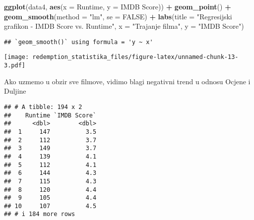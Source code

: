 \documentclass[
]{article}
\newenvironment{Shaded}{\begin{snugshade}}{\end{snugshade}}
\newcommand{\AttributeTok}[1]{\textcolor[rgb]{0.13,0.29,0.53}{#1}}
\newcommand{\CommentTok}[1]{\textcolor[rgb]{0.56,0.35,0.01}{\textit{#1}}}
\newcommand{\ConstantTok}[1]{\textcolor[rgb]{0.56,0.35,0.01}{#1}}
\newcommand{\FloatTok}[1]{\textcolor[rgb]{0.00,0.00,0.81}{#1}}
\newcommand{\FunctionTok}[1]{\textcolor[rgb]{0.13,0.29,0.53}{\textbf{#1}}}
\newcommand{\NormalTok}[1]{#1}
\newcommand{\OtherTok}[1]{\textcolor[rgb]{0.56,0.35,0.01}{#1}}
\newcommand{\SpecialCharTok}[1]{\textcolor[rgb]{0.81,0.36,0.00}{\textbf{#1}}}
\newcommand{\StringTok}[1]{\textcolor[rgb]{0.31,0.60,0.02}{#1}}
\begin{document}
\begin{Shaded}
\begin{Highlighting}[]
\FunctionTok{ggplot}\NormalTok{(data4, }\FunctionTok{aes}\NormalTok{(}\AttributeTok{x =}\NormalTok{ Runtime, }\AttributeTok{y =} \StringTok{\textasciigrave{}}\AttributeTok{IMDB Score}\StringTok{\textasciigrave{}}\NormalTok{)) }\SpecialCharTok{+}
  \FunctionTok{geom\_point}\NormalTok{() }\SpecialCharTok{+}
  \FunctionTok{geom\_smooth}\NormalTok{(}\AttributeTok{method =} \StringTok{"lm"}\NormalTok{, }\AttributeTok{se =} \ConstantTok{FALSE}\NormalTok{) }\SpecialCharTok{+}
  \FunctionTok{labs}\NormalTok{(}\AttributeTok{title =} \StringTok{"Regresijski grafikon {-} IMDB Score vs. Runtime"}\NormalTok{, }
       \AttributeTok{x =} \StringTok{"Trajanje filma"}\NormalTok{, }\AttributeTok{y =} \StringTok{"IMDB Score"}\NormalTok{)}
\end{Highlighting}
\end{Shaded}

\begin{verbatim}
## `geom_smooth()` using formula = 'y ~ x'
\end{verbatim}

\texttt{[image: redemption\_statistika\_files/figure-latex/unnamed-chunk-13-3.pdf]}

Ako uzmemo u obzir sve filmove, vidimo blagi negativni trend u odnosu
Ocjene i Duljine

\begin{Shaded}
\end{Shaded}

\begin{verbatim}
## # A tibble: 194 x 2
##    Runtime `IMDB Score`
##      <dbl>        <dbl>
##  1     147          3.5
##  2     112          3.7
##  3     149          3.7
##  4     139          4.1
##  5     112          4.1
##  6     144          4.3
##  7     115          4.3
##  8     120          4.4
##  9     105          4.4
## 10     107          4.5
## # i 184 more rows
\end{verbatim}
\end{document}
